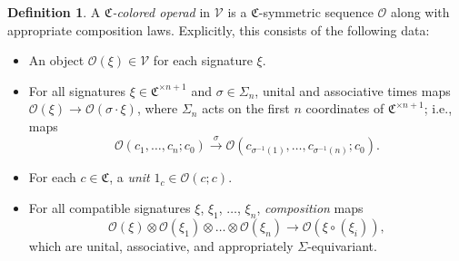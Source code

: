\documentclass[a4paper,10pt
,draft
]{article}%
\numberwithin{equation}{section}
\numberwithin{figure}{section}
\theoremstyle{definition} %
\newtheorem{definition}[equation]{Definition}%
\newcommand{\V}{\ensuremath{\mathcal V}}
\renewcommand{\O}{\ensuremath{\mathcal O}}
\newcommand{\ksi}{\xi}
\newcommand{\1}{\ensuremath{\mathbbm 1}}%
\begin{document}
\begin{definition}
      A \textit{$\mathfrak C$-colored operad} in $\V$ 
      is a $\mathfrak C$-symmetric sequence $\O$ along with appropriate composition laws.
      Explicitly, this consists of the following data:
      \begin{itemize} %
      \item An object $\O(\ksi) \in \V$ for each signature $\ksi$.
      \item For all signatures $\ksi \in \mathfrak C^{\times n+1}$ and $\sigma \in \Sigma_n$,
            unital and associative times maps $\O(\xi) \to \O(\sigma \cdot \xi)$,
            where $\Sigma_n$ acts on the first $n$ coordinates of $\mathfrak C^{\times n+1}$;
            i.e., maps
            \begin{equation}
                  \O(c_1, \ldots, c_n; c_0) \xrightarrow{\sigma} \O(c_{\sigma^{-1}(1)}, \ldots, c_{\sigma^{-1}(n)}; c_0).
            \end{equation}
      \item For each $c \in \mathfrak C$, a \textit{unit} $1_c \in \O(c;c)$.                        
      \item For all compatible signatures $\ksi$, $\ksi_1$, $\dots$, $\ksi_n$,
            \textit{composition} maps
            \begin{equation}
                  \O(\xi) \otimes \O(\xi_1) \otimes \ldots \otimes \O(\xi_n) \to \O(\xi \circ (\xi_i)),
            \end{equation}
            which are unital, associative, and appropriately $\Sigma$-equivariant.
      \end{itemize}
\end{definition}
\end{document}
